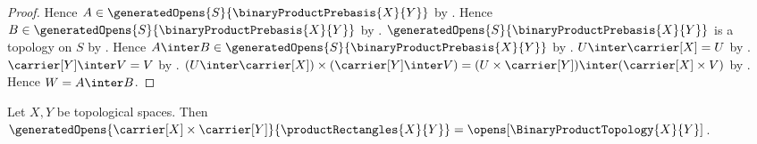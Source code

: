 \begin{proof}
    Hence $A\in\generatedOpens{S}{\binaryProductPrebasis{X}{Y}}$ by
        .
    Hence $B\in\generatedOpens{S}{\binaryProductPrebasis{X}{Y}}$ by
        .
    $\generatedOpens{S}{\binaryProductPrebasis{X}{Y}}$ is a topology on
        $S$ by
        .
    Hence $A\inter B\in
        \generatedOpens{S}{\binaryProductPrebasis{X}{Y}}$ by
        .
    $U\inter\carrier[X]=U$ by
        .
    $\carrier[Y]\inter V=V$ by
        .
    $(U\inter\carrier[X])\times(\carrier[Y]\inter V)
        =(U\times\carrier[Y])\inter(\carrier[X]\times V)$ by
        .
    Hence $W=A\inter B$.
\end{proof}

\begin{theorem}\label{product_rectangles_generate_product_opens}
    Let $X,Y$ be topological spaces.
    Then
        $\generatedOpens{
            \carrier[X]\times\carrier[Y]}{
            \productRectangles{X}{Y}}
        =\opens[\BinaryProductTopology{X}{Y}]$.
\end{theorem}
